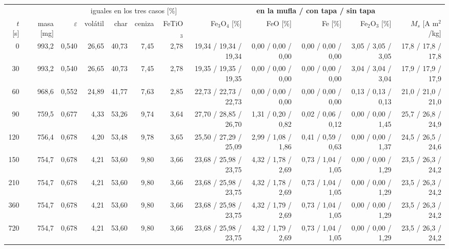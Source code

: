 \begin{tabular}{rrrrrrrrrrrr}
    \hline
     &  &  & \multicolumn{4}{c}{iguales en los tres casos [\%]} & \multicolumn{5}{c}{\textbf{en la mufla / con tapa / sin tapa}} \\
    $t$ [s] & masa [mg] & $\varepsilon$ & volátil & char & ceniza & FeTiO$_3$ & Fe$_3$O$_4$ [\%] & FeO [\%] & Fe [\%] & Fe$_2$O$_3$ [\%] & $M_s$ [A m$^2$/kg] \\
    \hline
    0 & 993,2 & 0,540 & 26,65 & 40,73 & 7,45 & 2,78 & 19,34 / 19,34 / 19,34 & 0,00 / 0,00 / 0,00 & 0,00 / 0,00 / 0,00 & 3,05 / 3,05 / 3,05 & 17,8 / 17,8 / 17,8 \\
    30 & 993,2 & 0,540 & 26,65 & 40,73 & 7,45 & 2,78 & 19,35 / 19,35 / 19,35 & 0,00 / 0,00 / 0,00 & 0,00 / 0,00 / 0,00 & 3,04 / 3,04 / 3,04 & 17,9 / 17,9 / 17,9 \\
    60 & 968,6 & 0,552 & 24,89 & 41,77 & 7,63 & 2,85 & 22,73 / 22,73 / 22,73 & 0,00 / 0,00 / 0,00 & 0,00 / 0,00 / 0,00 & 0,13 / 0,13 / 0,13 & 21,0 / 21,0 / 21,0 \\
    90 & 759,5 & 0,677 & 4,33 & 53,26 & 9,74 & 3,64 & 27,70 / 28,85 / 26,70 & 1,31 / 0,20 / 0,82 & 0,02 / 0,06 / 0,12 & 0,00 / 0,00 / 1,45 & 25,7 / 26,8 / 24,9 \\
    120 & 756,4 & 0,678 & 4,20 & 53,48 & 9,78 & 3,65 & 25,50 / 27,29 / 25,09 & 2,99 / 1,08 / 1,86 & 0,41 / 0,59 / 0,63 & 0,00 / 0,00 / 1,37 & 24,5 / 26,5 / 24,6 \\
    150 & 754,7 & 0,678 & 4,21 & 53,60 & 9,80 & 3,66 & 23,68 / 25,98 / 23,75 & 4,32 / 1,78 / 2,69 & 0,73 / 1,04 / 1,05 & 0,00 / 0,00 / 1,29 & 23,5 / 26,3 / 24,2 \\
    210 & 754,7 & 0,678 & 4,21 & 53,60 & 9,80 & 3,66 & 23,68 / 25,98 / 23,75 & 4,32 / 1,78 / 2,69 & 0,73 / 1,04 / 1,05 & 0,00 / 0,00 / 1,29 & 23,5 / 26,3 / 24,2 \\
    360 & 754,7 & 0,678 & 4,21 & 53,60 & 9,80 & 3,66 & 23,68 / 25,98 / 23,75 & 4,32 / 1,79 / 2,69 & 0,73 / 1,04 / 1,05 & 0,00 / 0,00 / 1,29 & 23,5 / 26,3 / 24,2 \\
    720 & 754,7 & 0,678 & 4,21 & 53,60 & 9,80 & 3,66 & 23,68 / 25,98 / 23,75 & 4,32 / 1,79 / 2,69 & 0,73 / 1,04 / 1,05 & 0,00 / 0,00 / 1,29 & 23,5 / 26,3 / 24,2 \\
    \hline
\end{tabular}
